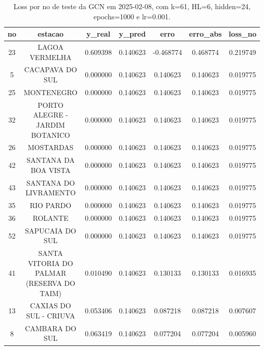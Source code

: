 \begin{table}[h]
\centering
\caption{Loss por no de teste da GCN em 2025-02-08, com k=61, HL=6, hidden=24, epochs=1000 e lr=0.001.}
\label{tab:gcn_loss_k61_hl6_h24_e1000_d20250208}
\begin{tabular}{ccccccc}
\toprule
no & estacao & y\_real & y\_pred & erro & erro\_abs & loss\_no \\
\midrule
23 & LAGOA VERMELHA & 0.609398 & 0.140623 & -0.468774 & 0.468774 & 0.219749 \\
5 & CACAPAVA DO SUL & 0.000000 & 0.140623 & 0.140623 & 0.140623 & 0.019775 \\
25 & MONTENEGRO & 0.000000 & 0.140623 & 0.140623 & 0.140623 & 0.019775 \\
32 & PORTO ALEGRE - JARDIM BOTANICO & 0.000000 & 0.140623 & 0.140623 & 0.140623 & 0.019775 \\
26 & MOSTARDAS & 0.000000 & 0.140623 & 0.140623 & 0.140623 & 0.019775 \\
42 & SANTANA DA BOA VISTA & 0.000000 & 0.140623 & 0.140623 & 0.140623 & 0.019775 \\
43 & SANTANA DO LIVRAMENTO & 0.000000 & 0.140623 & 0.140623 & 0.140623 & 0.019775 \\
35 & RIO PARDO & 0.000000 & 0.140623 & 0.140623 & 0.140623 & 0.019775 \\
36 & ROLANTE & 0.000000 & 0.140623 & 0.140623 & 0.140623 & 0.019775 \\
52 & SAPUCAIA DO SUL & 0.000000 & 0.140623 & 0.140623 & 0.140623 & 0.019775 \\
41 & SANTA VITORIA DO PALMAR (RESERVA DO TAIM) & 0.010490 & 0.140623 & 0.130133 & 0.130133 & 0.016935 \\
13 & CAXIAS DO SUL - CRIUVA & 0.053406 & 0.140623 & 0.087218 & 0.087218 & 0.007607 \\
8 & CAMBARA DO SUL & 0.063419 & 0.140623 & 0.077204 & 0.077204 & 0.005960 \\
\bottomrule
\end{tabular}
\end{table}
